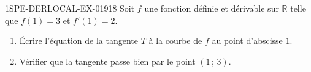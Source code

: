 \begin{exercice}{1SPE-DERLOCAL-EX-019}{1}{8}
Soit $f$ une fonction définie et dérivable sur $\mathbb{R}$ telle que $f(1) = 3$ et $f'(1) = 2$.

\begin{enumerate}
  \item Écrire l'équation de la tangente $T$ à la courbe de $f$ au point d'abscisse $1$.
  \item Vérifier que la tangente passe bien par le point $(1\,;\,3)$.
\end{enumerate}
\end{exercice}
